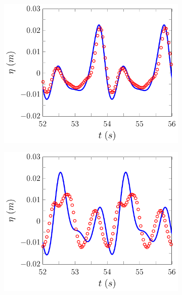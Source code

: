 \begin{figure}
	\centering
	\begin{subfigure}{0.5\textwidth}
		\includegraphics[width=\textwidth]{./chp6/figures/Experiment/Beji/sl/FEVMWG5.pdf}
		\vspace{0.5cm}
	\end{subfigure}%
	\begin{subfigure}{0.5\textwidth}
		\includegraphics[width=\textwidth]{./chp6/figures/Experiment/Beji/sl/FEVMWG6.pdf}
		\vspace{0.5cm}
	\end{subfigure}

\end{figure}
